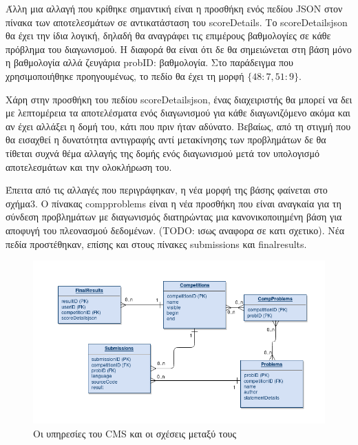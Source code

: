 \documentclass[diploma]{softlab-thesis}
\begin{document}
\bigskip

Άλλη μια αλλαγή που κρίθηκε σημαντική είναι η προσθήκη ενός πεδίου JSON στον
πίνακα των αποτελεσμάτων σε αντικατάσταση του scoreDetails. Το scoreDetailsjson
θα έχει την ίδια λογική, δηλαδή θα αναγράφει τις επιμέρους βαθμολογίες σε κάθε
πρόβλημα του διαγωνισμού. Η διαφορά θα είναι ότι δε θα σημειώνεται στη βάση μόνο
η βαθμολογία αλλά ζευγάρια probID: βαθμολογία. Στο παράδειγμα που χρησιμοποιήθηκε
προηγουμένως, το πεδίο θα έχει τη μορφή $\{48: 7, 51: 9\}$.

\bigskip

Χάρη στην προσθήκη του πεδίου scoreDetailsjson, ένας διαχειριστής θα μπορεί να δει
με λεπτομέρεια τα αποτελέσματα ενός διαγωνισμού για κάθε διαγωνιζόμενο ακόμα και
αν έχει αλλάξει η δομή του, κάτι που πριν ήταν αδύνατο. Βεβαίως, από τη στιγμή που
θα εισαχθεί η δυνατότητα αντιγραφής αντί μετακίνησης των προβλημάτων δε θα τίθεται
συχνά θέμα αλλαγής της δομής ενός διαγωνισμού μετά τον υπολογισμό αποτελεσμάτων και
την ολοκλήρωση του.

\bigskip

Έπειτα από τις αλλαγές που περιγράφηκαν, η νέα μορφή της βάσης φαίνεται στο σχήμα3.
Ο πίνακας compproblems είναι η νέα προσθήκη που είναι αναγκαία για τη σύνδεση
προβλημάτων με διαγωνισμός διατηρώντας μια κανονικοποιημένη βάση για αποφυγή του
πλεονασμού δεδομένων. (TODO: ισως αναφορα σε κατι σχετικο). Νέα πεδία προστέθηκαν,
επίσης και στους πίνακες submissions και finalresults.

\bigskip

\begin{figure}
  \centering
  \includegraphics[scale=0.4,trim=4 4 4 4,clip]{Figures/sepafter.png}
  \caption[Η αρχιτεκτονική του CMS]{Οι υπηρεσίες του CMS και οι σχέσεις μεταξύ τους}
\end{figure}
\end{document}

